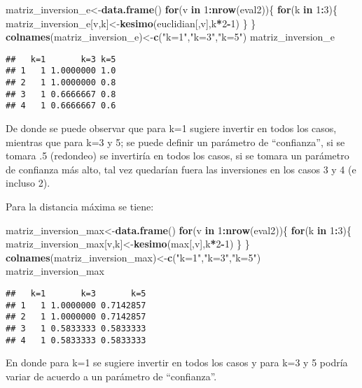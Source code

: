 \documentclass[]{article}
\newenvironment{Shaded}{\begin{snugshade}}{\end{snugshade}}
\newcommand{\KeywordTok}[1]{\textcolor[rgb]{0.13,0.29,0.53}{\textbf{#1}}}
\newcommand{\DecValTok}[1]{\textcolor[rgb]{0.00,0.00,0.81}{#1}}
\newcommand{\StringTok}[1]{\textcolor[rgb]{0.31,0.60,0.02}{#1}}
\newcommand{\ControlFlowTok}[1]{\textcolor[rgb]{0.13,0.29,0.53}{\textbf{#1}}}
\newcommand{\OperatorTok}[1]{\textcolor[rgb]{0.81,0.36,0.00}{\textbf{#1}}}
\newcommand{\NormalTok}[1]{#1}
\begin{document}
\begin{Shaded}
\begin{Highlighting}[]
\NormalTok{matriz_inversion_e<-}\KeywordTok{data.frame}\NormalTok{()}
\ControlFlowTok{for}\NormalTok{(v }\ControlFlowTok{in} \DecValTok{1}\OperatorTok{:}\KeywordTok{nrow}\NormalTok{(eval2))\{}
  \ControlFlowTok{for}\NormalTok{(k }\ControlFlowTok{in} \DecValTok{1}\OperatorTok{:}\DecValTok{3}\NormalTok{)\{}
\NormalTok{    matriz_inversion_e[v,k]<-}\KeywordTok{kesimo}\NormalTok{(euclidian[,v],k}\OperatorTok{*}\DecValTok{2}\OperatorTok{-}\DecValTok{1}\NormalTok{)}
\NormalTok{  \}}
\NormalTok{\}}
\KeywordTok{colnames}\NormalTok{(matriz_inversion_e)<-}\KeywordTok{c}\NormalTok{(}\StringTok{"k=1"}\NormalTok{,}\StringTok{"k=3"}\NormalTok{,}\StringTok{"k=5"}\NormalTok{)}
\NormalTok{matriz_inversion_e}
\end{Highlighting}
\end{Shaded}

\begin{verbatim}
##   k=1       k=3 k=5
## 1   1 1.0000000 1.0
## 2   1 1.0000000 0.8
## 3   1 0.6666667 0.8
## 4   1 0.6666667 0.6
\end{verbatim}

De donde se puede observar que para k=1 sugiere invertir en todos los
casos, mientras que para k=3 y 5; se puede definir un parámetro de
``confianza'', si se tomara .5 (redondeo) se invertiría en todos los
casos, si se tomara un parámetro de confianza más alto, tal vez
quedarían fuera las inversiones en los casos 3 y 4 (e incluso 2).

Para la distancia máxima se tiene:

\begin{Shaded}
\begin{Highlighting}[]
\NormalTok{matriz_inversion_max<-}\KeywordTok{data.frame}\NormalTok{()}
\ControlFlowTok{for}\NormalTok{(v }\ControlFlowTok{in} \DecValTok{1}\OperatorTok{:}\KeywordTok{nrow}\NormalTok{(eval2))\{}
  \ControlFlowTok{for}\NormalTok{(k }\ControlFlowTok{in} \DecValTok{1}\OperatorTok{:}\DecValTok{3}\NormalTok{)\{}
\NormalTok{    matriz_inversion_max[v,k]<-}\KeywordTok{kesimo}\NormalTok{(max[,v],k}\OperatorTok{*}\DecValTok{2}\OperatorTok{-}\DecValTok{1}\NormalTok{)}
\NormalTok{  \}}
\NormalTok{\}}
\KeywordTok{colnames}\NormalTok{(matriz_inversion_max)<-}\KeywordTok{c}\NormalTok{(}\StringTok{"k=1"}\NormalTok{,}\StringTok{"k=3"}\NormalTok{,}\StringTok{"k=5"}\NormalTok{)}
\NormalTok{matriz_inversion_max}
\end{Highlighting}
\end{Shaded}

\begin{verbatim}
##   k=1       k=3       k=5
## 1   1 1.0000000 0.7142857
## 2   1 1.0000000 0.7142857
## 3   1 0.5833333 0.5833333
## 4   1 0.5833333 0.5833333
\end{verbatim}

En donde para k=1 se sugiere invertir en todos los casos y para k=3 y 5
podría variar de acuerdo a un parámetro de ``confianza''.
\end{document}
